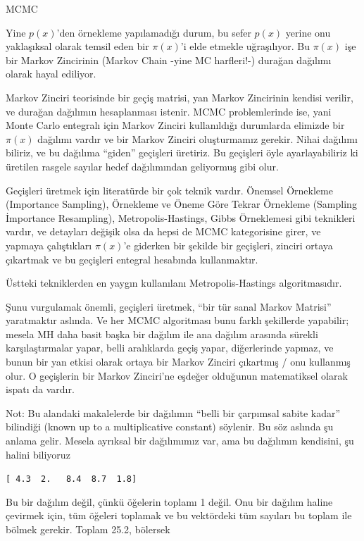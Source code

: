 \documentclass[12pt,fleqn]{article}\usepackage{../../common}
\begin{document}
MCMC

Yine $p(x)$'den örnekleme yapılamadığı durum, bu sefer $p(x)$ yerine onu
yaklaşıksal olarak temsil eden bir $\pi(x)$'i elde etmekle uğraşılıyor. Bu
$\pi(x)$ işe bir Markov Zincirinin (Markov Chain -yine MC harfleri!-) durağan
dağılımı olarak hayal ediliyor.

Markov Zinciri teorisinde bir geçiş matrisi, yan Markov Zincirinin kendisi
verilir, ve durağan dağılımın hesaplanması istenir. MCMC problemlerinde
ise, yani Monte Carlo entegralı için Markov Zinciri kullanıldığı durumlarda
elimizde bir $\pi(x)$ dağılımı vardır ve bir Markov Zinciri oluşturmamız
gerekir. Nihai dağılımı biliriz, ve bu dağılıma ``giden'' geçişleri
üretiriz. Bu geçişleri öyle ayarlayabiliriz ki üretilen rasgele sayılar
hedef dağılımından geliyormuş gibi olur. 

Geçişleri üretmek için literatürde bir çok teknik vardır.  Önemsel
Örnekleme (Importance Sampling), Örnekleme ve Öneme Göre Tekrar Örnekleme
(Sampling İmportance Resampling), Metropolis-Hastings, Gibbs Örneklemesi
gibi teknikleri vardır, ve detayları değişik olsa da hepsi de MCMC
kategorisine girer, ve yapmaya çalıştıkları $\pi(x)$'e giderken bir şekilde
bir geçişleri, zinciri ortaya çıkartmak ve bu geçişleri entegral hesabında
kullanmaktır.

Üstteki tekniklerden en yaygın kullanılanı Metropolis-Hastings
algoritmasıdır. 

Şunu vurgulamak önemli, geçişleri üretmek, ``bir tür sanal Markov Matrisi''
yaratmaktır aslında. Ve her MCMC algoritması bunu farklı şekillerde
yapabilir; mesela MH daha basit başka bir dağılım ile ana dağılım arasında
sürekli karşılaştırmalar yapar, belli aralıklarda geçiş yapar, diğerlerinde
yapmaz, ve bunun bir yan etkisi olarak ortaya bir Markov Zinciri çıkartmış
/ onu kullanmış olur. O geçişlerin bir Markov Zinciri'ne eşdeğer olduğunun
matematiksel olarak ispatı da vardır.

Not: Bu alandaki makalelerde bir dağılımın ``belli bir çarpımsal sabite
kadar'' bilindiği (known up to a multiplicative constant) söylenir. Bu söz
aslında şu anlama gelir. Mesela ayrıksal bir dağılımımız var, ama bu
dağılımın kendisini, şu halini biliyoruz

\verb![ 4.3  2.   8.4  8.7  1.8]!

Bu bir dağılım değil, çünkü öğelerin toplamı 1 değil. Onu bir dağılım
haline çevirmek için, tüm öğeleri toplamak ve bu vektördeki tüm sayıları bu
toplam ile bölmek gerekir. Toplam 25.2, bölersek
\end{document}
